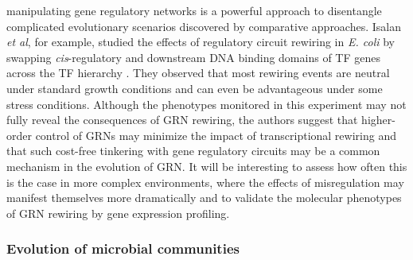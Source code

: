 manipulating gene regulatory networks is a powerful approach to disentangle complicated evolutionary scenarios discovered by comparative approaches.  Isalan \textit{et al}, for example, studied the effects of regulatory circuit rewiring in \textit{E. coli} by swapping \textit{cis}-regulatory and downstream DNA binding domains of TF genes across the TF hierarchy \cite{isalan_evolvability_2008}.  They observed that most rewiring events are neutral under standard growth conditions and can even be advantageous under some stress conditions. Although the phenotypes monitored in this experiment may not fully reveal the consequences of GRN rewiring, the authors suggest that higher-order control of GRNs may minimize the impact of transcriptional rewiring and that such cost-free tinkering with gene regulatory circuits may be a common mechanism in the evolution of GRN.  It will be interesting to assess how often this is the case in more complex environments, where the effects of misregulation may manifest themselves more dramatically and to validate the molecular phenotypes of GRN rewiring by gene expression profiling. 

\subsubsection{Evolution of microbial communities} 

